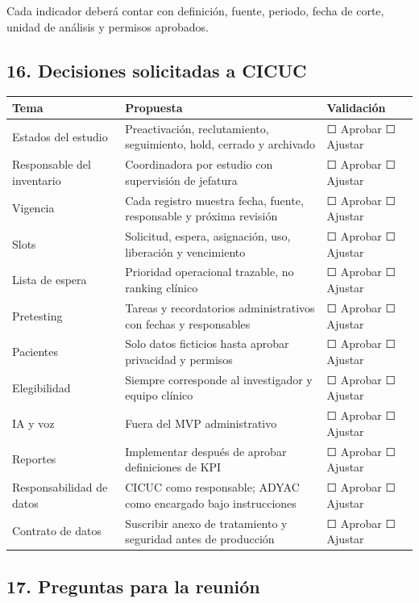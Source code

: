\documentclass[
]{article}
\begin{document}
Cada indicador deberá contar con definición, fuente, periodo, fecha de
corte, unidad de análisis y permisos aprobados.

\hypertarget{16-decisiones-solicitadas-a-cicuc}{%
\subsection{16. Decisiones solicitadas a
CICUC}\label{16-decisiones-solicitadas-a-cicuc}}

\begin{longtable}[]{@{}lll@{}}
\toprule\noalign{}
Tema & Propuesta & Validación \\
\midrule\noalign{}
\endhead
\bottomrule\noalign{}
\endlastfoot
Estados del estudio & Preactivación, reclutamiento, seguimiento, hold,
cerrado y archivado & ☐ Aprobar ☐ Ajustar \\
Responsable del inventario & Coordinadora por estudio con supervisión de
jefatura & ☐ Aprobar ☐ Ajustar \\
Vigencia & Cada registro muestra fecha, fuente, responsable y próxima
revisión & ☐ Aprobar ☐ Ajustar \\
Slots & Solicitud, espera, asignación, uso, liberación y vencimiento & ☐
Aprobar ☐ Ajustar \\
Lista de espera & Prioridad operacional trazable, no ranking clínico & ☐
Aprobar ☐ Ajustar \\
Pretesting & Tareas y recordatorios administrativos con fechas y
responsables & ☐ Aprobar ☐ Ajustar \\
Pacientes & Solo datos ficticios hasta aprobar privacidad y permisos & ☐
Aprobar ☐ Ajustar \\
Elegibilidad & Siempre corresponde al investigador y equipo clínico & ☐
Aprobar ☐ Ajustar \\
IA y voz & Fuera del MVP administrativo & ☐ Aprobar ☐ Ajustar \\
Reportes & Implementar después de aprobar definiciones de KPI & ☐
Aprobar ☐ Ajustar \\
Responsabilidad de datos & CICUC como responsable; ADYAC como encargado
bajo instrucciones & ☐ Aprobar ☐ Ajustar \\
Contrato de datos & Suscribir anexo de tratamiento y seguridad antes de
producción & ☐ Aprobar ☐ Ajustar \\
\end{longtable}

\hypertarget{17-preguntas-para-la-reuniuxf3n}{%
\subsection{17. Preguntas para la
reunión}\label{17-preguntas-para-la-reuniuxf3n}}
\end{document}
